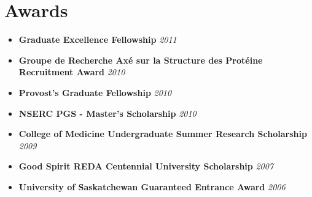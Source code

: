 \documentclass[letterpaper,11pt]{article}
\newcommand{\award}[2]{
	\item[]
	  \textbf{#1} \hfill \textit{#2}
}
\begin{document}
\section{Awards}
 \begin{itemize}[leftmargin=*,noitemsep,topsep=0pt]
	\award{Graduate Excellence Fellowship}{2011}
	\award{Groupe de Recherche Axé sur la Structure des Protéine Recruitment Award}{2010}
	\award{Provost’s Graduate Fellowship}{2010}
	\award{NSERC PGS - Master’s Scholarship}{2010}
	\award{College of Medicine Undergraduate Summer Research Scholarship}{2009}
	\award{Good Spirit REDA Centennial University Scholarship}{2007}
	\award{University of Saskatchewan Guaranteed Entrance Award}{2006}
  \end{itemize}

\end{document}
